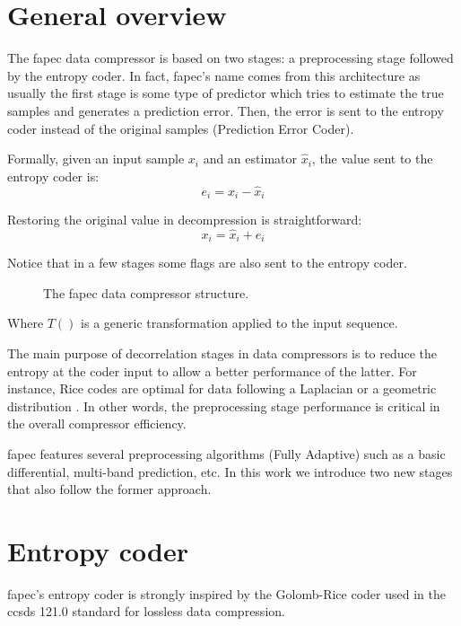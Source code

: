 \section{General overview}
The \acrshort{fapec} data compressor is based on two stages: a preprocessing stage followed by the entropy coder. In fact, \acrshort{fapec}'s name comes from this architecture as usually the first stage is some type of predictor which tries to estimate the true samples and generates a prediction error. Then, the error is sent to the entropy coder instead of the original samples (Prediction Error Coder).

Formally, given an input sample $x_i$ and an estimator $\hat{x}_i$, the value sent to the entropy coder is:
\begin{equation}
e_i = x_i - \hat{x}_i
\end{equation}

Restoring the original value in decompression is straightforward:
\begin{equation}
x_i = \hat{x}_i + e_i
\end{equation}

Notice that in a few stages some flags are also sent to the entropy coder.

\begin{figure}[h!]
	\begin{center}
		\scalebox{.565}{}
	\end{center}
	\caption{The \acrshort{fapec} data compressor structure.}
	\label{fig:fapec_structure}
\end{figure}

Where $T()$ is a generic transformation applied to the input sequence.

The main purpose of decorrelation stages in data compressors is to reduce the entropy at the coder input to allow a better performance of the latter. For instance, Rice codes are optimal for data following a Laplacian or a geometric distribution \parencite{OptimalRice} \parencite{OptimalGeometric}. In other words, the preprocessing stage performance is critical in the overall compressor efficiency.

\acrshort{fapec} features several preprocessing algorithms (Fully Adaptive) such as a basic differential, multi-band prediction, etc. In this work we introduce two new stages that also follow the former approach.

\section{Entropy coder}
\acrshort{fapec}'s entropy coder is strongly inspired by the Golomb-Rice coder used in the \acrshort{ccsds} 121.0 standard for lossless data compression.